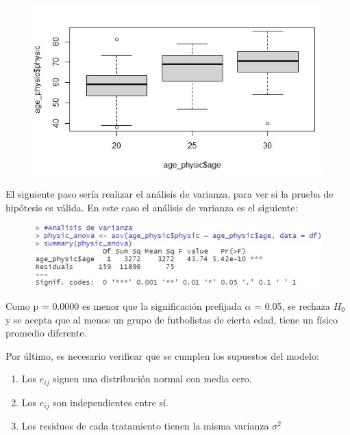 \documentclass[a4paper,10pt,twocolumn]{article}
\begin{document}
\begin{figure}[h]
	\includegraphics[scale=0.55]{./imgs/anova_boxplot.jpg}
\end{figure}

El siguiente paso sería realizar el análisis de varianza, para ver si la prueba de hipótesis es válida. En este
caso el análisis de varianza es el siguiente:

\begin{figure}[h]
	\includegraphics[scale=0.55]{./imgs/anova_summary.jpg}
\end{figure}

Como p = 0.0000 es menor que la significación prefijada $\alpha$ = 0.05, se rechaza $H_{0}$ y se acepta que al menos un grupo de futbolistas de cierta edad, tiene un físico promedio diferente. 

Por último, es necesario verificar que se cumplen los supuestos del modelo:
\begin{enumerate}
	\item Los $e_{ij}$ siguen una distribución normal con media cero.
	\item Los $e_{ij}$ son independientes entre sí.
	\item Los residuos de cada tratamiento tienen la misma varianza $\sigma^{2}$
\end{enumerate}
\end{document}
